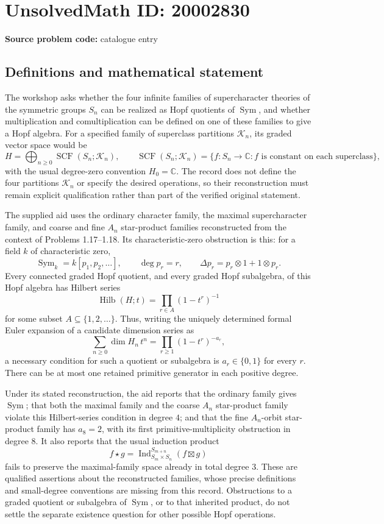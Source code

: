 \documentclass[11pt]{article}
\newcommand{\C}{\mathbb{C}}
\begin{document}
\section*{UnsolvedMath ID: 20002830}
\textbf{Source problem code:} catalogue entry
\subsection{Definitions and mathematical statement}
The workshop asks whether the four infinite families of supercharacter theories of the symmetric groups $S_n$ can be realized as Hopf quotients of $\operatorname{Sym}$, and whether multiplication and comultiplication can be defined on one of these families to give a Hopf algebra. For a specified family of superclass partitions $\mathcal K_n$, its graded vector space would be
\[
H=\bigoplus_{n\geq0}\operatorname{SCF}(S_n;\mathcal K_n),\qquad
\operatorname{SCF}(S_n;\mathcal K_n)=\{f:S_n\to\C:f\text{ is constant on each superclass}\},
\]
with the usual degree-zero convention $H_0=\C$. The record does not define the four partitions $\mathcal K_n$ or specify the desired operations, so their reconstruction must remain explicit qualification rather than part of the verified original statement.

The supplied aid uses the ordinary character family, the maximal supercharacter family, and coarse and fine $A_n$ star-product families reconstructed from the context of Problems 1.17--1.18. Its characteristic-zero obstruction is this: for a field $k$ of characteristic zero,
\[
\operatorname{Sym}_k=k[p_1,p_2,\ldots],\qquad
\deg p_r=r,\qquad \Delta p_r=p_r\otimes1+1\otimes p_r.
\]
Every connected graded Hopf quotient, and every graded Hopf subalgebra, of this Hopf algebra has Hilbert series
\[
\operatorname{Hilb}(H;t)=\prod_{r\in A}(1-t^r)^{-1}
\]
for some subset $A\subseteq\{1,2,\ldots\}$. Thus, writing the uniquely determined formal Euler expansion of a candidate dimension series as
\[
\sum_{n\geq0}\dim H_n\,t^n=\prod_{r\geq1}(1-t^r)^{-a_r},
\]
a necessary condition for such a quotient or subalgebra is $a_r\in\{0,1\}$ for every $r$. There can be at most one retained primitive generator in each positive degree.

Under its stated reconstruction, the aid reports that the ordinary family gives $\operatorname{Sym}$; that both the maximal family and the coarse $A_n$ star-product family violate this Hilbert-series condition in degree $4$; and that the fine $A_n$-orbit star-product family has $a_8=2$, with its first primitive-multiplicity obstruction in degree $8$. It also reports that the usual induction product
\[
f\star g=\operatorname{Ind}_{S_m\times S_n}^{S_{m+n}}(f\boxtimes g)
\]
fails to preserve the maximal-family space already in total degree $3$. These are qualified assertions about the reconstructed families, whose precise definitions and small-degree conventions are missing from this record. Obstructions to a graded quotient or subalgebra of $\operatorname{Sym}$, or to that inherited product, do not settle the separate existence question for other possible Hopf operations.
\end{document}
